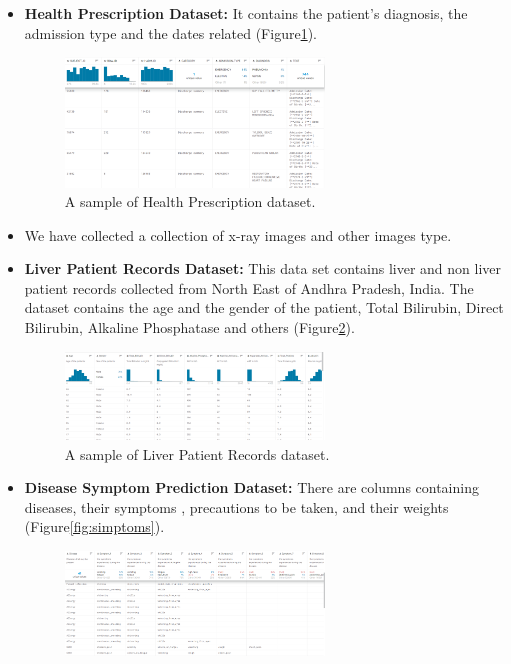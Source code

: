 \begin{itemize}
   \item \textbf{Health Prescription Dataset: }It contains the patient's diagnosis, the admission type and the dates related (Figure\ref{fig:presc}).
   \begin{figure}[h!]
    \center
    \includegraphics[width=0.65\textwidth]{images/chapter3/dataset/healthprescription.PNG}
    \caption{A sample of Health Prescription dataset.}
    \label{fig:presc}
  \end{figure}
  \item We have collected a collection of x-ray images and other images type.
  \newpage
  \item \textbf{Liver Patient Records Dataset:} This data set contains liver and non liver patient records collected from North East of Andhra Pradesh, India. The dataset contains the age and the gender of the patient, Total Bilirubin, Direct Bilirubin, Alkaline Phosphatase and others (Figure\ref{fig:liver}).
  \begin{figure}[h!]
    \center
    \includegraphics[width=0.65\textwidth]{images/chapter3/dataset/indianliver.PNG}
    \caption{A sample of Liver Patient Records dataset.}
    \label{fig:liver}
  \end{figure}
  \item \textbf{Disease Symptom Prediction Dataset:} There are columns containing diseases, their symptoms , precautions to be taken, and their weights (Figure\ref{fig:simptoms}).
  \begin{figure}[h!]
    \center
    \includegraphics[width=0.65\textwidth]{images/chapter3/dataset/simptoms.PNG}

\end{figure}
\end{itemize}
